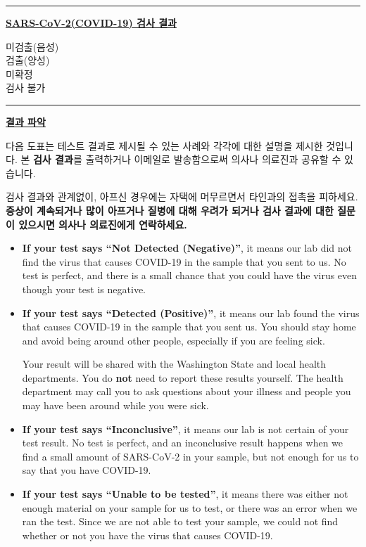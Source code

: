 \documentclass[10pt]{article}
\newcommand{\PageLine}{\rule{\textwidth}{0.25mm}}
\begin{document}
\bigskip
\PageLine

\large \underline{\textbf{SARS-CoV-2(COVID-19) 검사 결과}}

미검출(음성)\\
검출(양성)\\
미확정\\
검사 불가\\

\PageLine
\bigskip

\large \underline{\textbf{결과 파악}}

다음 도표는 테스트 결과로 제시될 수 있는 사례와 각각에 대한 설명을 제시한 것입니다. 본
\textbf{검사 결과}를 출력하거나 이메일로 발송함으로써 의사나 의료진과 공유할 수 있습니다.

검사 결과와 관계없이, 아프신 경우에는 자택에 머무르면서 타인과의 접촉을 피하세요. \textbf{증상이
계속되거나 많이 아프거나 질병에 대해 우려가 되거나 검사 결과에 대한 질문이 있으시면 의사나
의료진에게 연락하세요.}

\begin{itemize}


\item

  \textbf{If your test says ``Not Detected (Negative)''}, it means our lab did not find the
  virus that causes COVID-19 in the sample that you sent to us. No test is
  perfect, and there is a small chance that you could have the virus even though
  your test is negative.

\item

  \textbf{If your test says ``Detected (Positive)''}, it means our
  lab found the virus that causes COVID-19 in the sample that you sent us. You
  should stay home and avoid being around other people, especially if you are
  feeling sick.

  Your result will be shared with the Washington State and local health
  departments. You do \textbf{not} need to report these results yourself. The
  health department may call you to ask questions about your illness and people
  you may have been around while you were sick.

\item

  \textbf{If your test says ``Inconclusive''}, it means our lab is not certain
  of your test result. No test is perfect, and an inconclusive result happens
  when we find a small amount of SARS-CoV-2 in your sample, but not enough for
  us to say that you have COVID-19.

\item

  \textbf{If your test says ``Unable to be tested''}, it means there was either
  not enough material on your sample for us to test, or there was an error when
  we ran the test. Since we are not able to test your sample, we could not find
  whether or not you have the virus that causes COVID-19.

\end{itemize}
\end{document}
